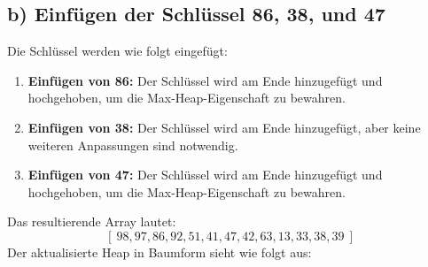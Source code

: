 \documentclass{article}
\begin{document}
\subsection*{b) Einfügen der Schlüssel 86, 38, und 47}
Die Schlüssel werden wie folgt eingefügt:
\begin{enumerate}[label=$b.\arabic*)$]
    \item \textbf{Einfügen von 86:} Der Schlüssel wird am Ende hinzugefügt und hochgehoben, um die Max-Heap-Eigenschaft zu bewahren.
    \item \textbf{Einfügen von 38:} Der Schlüssel wird am Ende hinzugefügt, aber keine weiteren Anpassungen sind notwendig.
    \item \textbf{Einfügen von 47:} Der Schlüssel wird am Ende hinzugefügt und hochgehoben, um die Max-Heap-Eigenschaft zu bewahren.
\end{enumerate}
Das resultierende Array lautet:
\[[\ 98, 97, 86, 92, 51, 41, 47, 42, 63, 13, 33, 38, 39\ ]\]
Der aktualisierte Heap in Baumform sieht wie folgt aus:
\begin{center}
\end{center}
\end{document}
